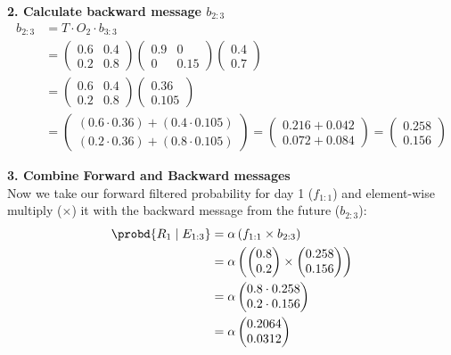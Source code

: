 \textbf{2. Calculate backward message $b_{2:3}$}
\begin{align*}
b_{2:3} &= T \cdot O_2 \cdot b_{3:3} \\
&= \begin{pmatrix}
0.6 & 0.4 \\
0.2 & 0.8
\end{pmatrix}
\begin{pmatrix}
0.9 & 0 \\
0 & 0.15
\end{pmatrix}
\begin{pmatrix}
0.4 \\ 
0.7
\end{pmatrix} \\
&= \begin{pmatrix}
0.6 & 0.4 \\
0.2 & 0.8
\end{pmatrix}
\begin{pmatrix}
0.36 \\
0.105
\end{pmatrix} \\
&= \begin{pmatrix}
(0.6 \cdot 0.36) + (0.4 \cdot 0.105) \\
(0.2 \cdot 0.36) + (0.8 \cdot 0.105)
\end{pmatrix}
= \begin{pmatrix}
0.216 + 0.042 \\
0.072 + 0.084
\end{pmatrix}
= \begin{pmatrix}
0.258 \\
0.156
\end{pmatrix}
\end{align*}

\textbf{3. Combine Forward and Backward messages} \\
Now we take our forward filtered probability for day 1 ($f_{1:1}$) and element-wise multiply ($\times$) it with the backward message from the future ($b_{2:3}$):
\begin{align*}
\probd{R_1 \mid E_{1:3}} &= \alpha \left( f_{1:1} \times b_{2:3} \right) \\
&= \alpha \left( 
\begin{pmatrix} 0.8 \\ 0.2 \end{pmatrix} 
\times 
\begin{pmatrix} 0.258 \\ 0.156 \end{pmatrix} 
\right) \\
&= \alpha \begin{pmatrix} 0.8 \cdot 0.258 \\ 0.2 \cdot 0.156 \end{pmatrix} \\
&= \alpha \begin{pmatrix} 0.2064 \\ 0.0312 \end{pmatrix}
\end{align*}

